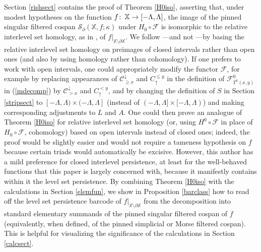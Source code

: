 \documentclass[11pt]{amsart}
\theoremstyle{definition}
\theoremstyle{remark}
\numberwithin{equation}{section}
\def\co{\colon\thinspace}
\begin{document}
Section \ref{rishsect} contains the proof of Theorem \ref{H0iso}, asserting that, under modest hypotheses on the function $f\co \mathbb{X}\to [-\Lambda,\Lambda]$, the image of the pinned singular filtered cospan $\mathcal{S}_{\partial}(\mathbb{X},f;\kappa)$ under $H_0\circ\mathcal{F}$ is isomorphic to the relative interlevel set homology, as in \cite{BBF20}, of $f|_{\mathbb{X}\setminus\partial\mathbb{X}}$.  We follow \cite{BBF20}---and not \cite{BBF21}---by basing the relative interlevel set homology on preimages of closed intervals rather than open ones (and also by using homology rather than cohomology).  If one prefers to work with open intervals, one could appropriately modify the functor $\mathcal{F}$, for example by replacing appearances of $\mathcal{C}^{\downarrow}_{\geq x}$ and $C_{\uparrow}^{\leq y}$ in the definition of $\mathcal{F}^0_{T^k(x,y)}$ in (\ref{mdecomp})  by $\mathcal{C}^{\downarrow}_{>x}$ and $C_{\uparrow}^{<y}$,  and by changing the definition of $S$ in Section \ref{stripsect} to $[-\Lambda,\Lambda)\times (-\Lambda,\Lambda]$ (instead of $(-\Lambda,\Lambda]\times [-\Lambda,\Lambda)$) and making corresponding adjustments to $L$ and $A$.  One could then prove an analogue of Theorem \ref{H0iso} for relative interlevel set homology (or, using $H^0\circ\mathcal{F}$ in place of $H_0\circ\mathcal{F}$, cohomology) based on open intervals instead of closed ones; indeed, the proof would be slightly easier and would not require a tameness hypothesis on $f$ because certain triads would automatically be excisive.   However, this author has a mild preference for closed interlevel persistence, at least for the well-behaved functions that this paper is largely concerned with, because it manifestly contains within it the level set persistence.  By combining Theorem \ref{H0iso} with the calculations in Section \ref{elemfun}, we show in Proposition \ref{barclass} how to read off the level set persistence barcode of $f|_{\mathbb{X}\setminus\partial\mathbb{X}}$ from the decomposition into standard elementary summands of the pinned singular filtered cospan of $f$ (equivalently, when defined, of the pinned simplicial or Morse filtered cospan).  This is helpful for visualizing the significance of the calculations in Section \ref{calcsect}.
\end{document}
